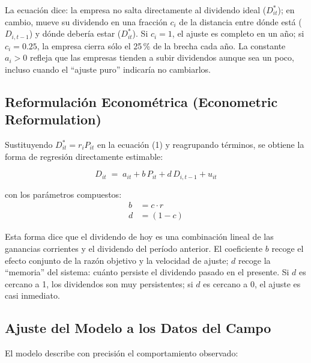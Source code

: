 \documentclass[12pt]{article}
\begin{document}
\begin{intuicionmat}
La ecuaci\'on dice: la empresa no salta directamente al dividendo ideal ($D^*_{it}$);
en cambio, mueve su dividendo en una fracci\'on $c_i$ de la distancia entre d\'onde est\'a
($D_{i,t-1}$) y d\'onde deber\'ia estar ($D^*_{it}$). Si $c_i = 1$, el ajuste es completo
en un a\~no; si $c_i = 0.25$, la empresa cierra s\'olo el 25\,\% de la brecha cada a\~no.
La constante $a_i > 0$ refleja que las empresas tienden a subir dividendos aunque sea un poco,
incluso cuando el ``ajuste puro'' indicar\'ia no cambiarlos.
\end{intuicionmat}

\subsection{Reformulaci\'on Econom\'etrica (Econometric Reformulation)}

Sustituyendo $D^*_{it} = r_i P_{it}$ en la ecuaci\'on (1) y reagrupando t\'erminos, se obtiene
la forma de regresi\'on directamente estimable:

\begin{equation}
  D_{it} \;=\; a_{it} + b\,P_{it} + d\,D_{i,t-1} + u_{it}
\end{equation}

con los par\'ametros compuestos:
\begin{align}
  b &= c \cdot r \\
  d &= (1 - c)
\end{align}

\begin{intuicionmat}
Esta forma dice que el dividendo de hoy es una combinaci\'on lineal de las ganancias
corrientes y el dividendo del per\'iodo anterior. El coeficiente $b$ recoge el efecto
conjunto de la raz\'on objetivo y la velocidad de ajuste; $d$ recoge la ``memoria'' del
sistema: cu\'anto persiste el dividendo pasado en el presente. Si $d$ es cercano a 1,
los dividendos son muy persistentes; si $d$ es cercano a 0, el ajuste es casi inmediato.
\end{intuicionmat}

\subsection{Ajuste del Modelo a los Datos del Campo}

El modelo describe con precisi\'on el comportamiento observado:
\end{document}
